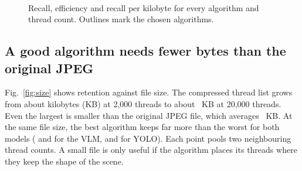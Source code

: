 \documentclass[conference]{IEEEtran}
\let\LaTeXcaption\caption
\let\caption\LaTeXcaption
\newcommand{\bestrow}[1]{\draw[white, line width=2.2pt] (axis cs:-0.5,#1-0.5) rectangle (axis cs:9.5,#1+0.5);\draw[black, line width=0.9pt] (axis cs:-0.5,#1-0.5) rectangle (axis cs:9.5,#1+0.5);}
\begin{document}
\begin{figure}[t]
\\[4pt]
\hspace{0.5em}%
\hspace{0.5em}%
\caption{Recall, efficiency and recall per kilobyte for every algorithm and thread count. Outlines mark the chosen algorithms.}
\label{fig:heatmaps}
\end{figure}


\subsection{A good algorithm needs fewer bytes than the original JPEG}

Fig.~\ref{fig:size} shows retention against file size. The compressed thread list grows from about \XzKBlow{} kilobytes (KB) at 2,000 threads to about \XzKBhigh{}~KB at 20,000 threads. Even the largest is smaller than the original JPEG file, which averages \JpegMeanKB{}~KB. At the same file size, the best algorithm keeps far more than the worst for both models (\VlmBest{} and \VlmWorst{} for the VLM, \YoloBest{} and \YoloWorst{} for YOLO). Each point pools two neighbouring thread counts. A small file is only useful if the algorithm places its threads where they keep the shape of the scene.
\end{document}
